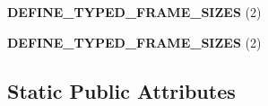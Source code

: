 \begin{DoxyCompactItemize}
\item 
{\bfseries D\+E\+F\+I\+N\+E\+\_\+\+T\+Y\+P\+E\+D\+\_\+\+F\+R\+A\+M\+E\+\_\+\+S\+I\+Z\+ES} (2)\hypertarget{classv8_1_1internal_1_1_exit_frame_constants_a8d4711c089dda5572b55a4e51de03daa}{}\label{classv8_1_1internal_1_1_exit_frame_constants_a8d4711c089dda5572b55a4e51de03daa}

\item 
{\bfseries D\+E\+F\+I\+N\+E\+\_\+\+T\+Y\+P\+E\+D\+\_\+\+F\+R\+A\+M\+E\+\_\+\+S\+I\+Z\+ES} (2)\hypertarget{classv8_1_1internal_1_1_exit_frame_constants_a8d4711c089dda5572b55a4e51de03daa}{}\label{classv8_1_1internal_1_1_exit_frame_constants_a8d4711c089dda5572b55a4e51de03daa}

\end{DoxyCompactItemize}
\subsection*{Static Public Attributes}
